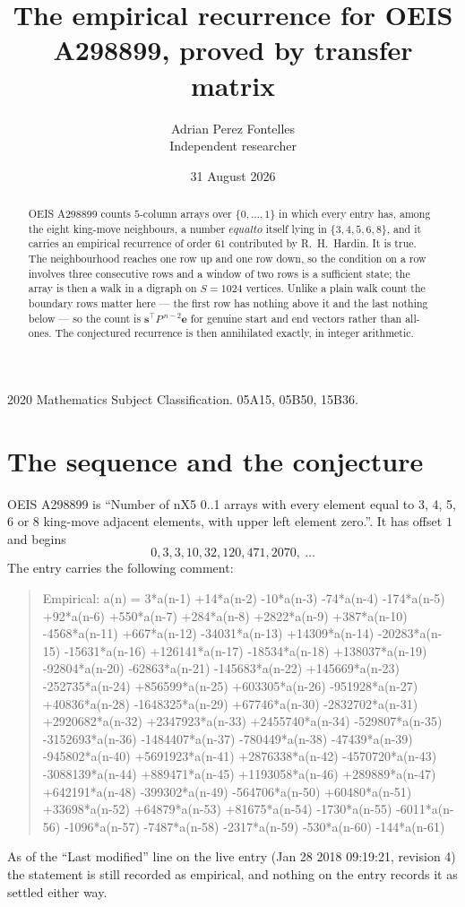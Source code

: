 \documentclass[11pt,a4paper]{article}
\title{The empirical recurrence for OEIS A298899, proved by transfer matrix}
\author{Adrian Perez Fontelles\\ \small Independent researcher}
\date{31 August 2026}
\theoremstyle{plain}
\theoremstyle{definition}
\begin{document}
\maketitle

\begin{abstract}
OEIS A298899 counts $5$-column arrays over $\{0,\dots,1\}$ in which every entry has,
among the eight king-move neighbours, a number $equal to$ itself lying in $\{3,4,5,6,8\}$, and it carries an empirical
recurrence of order $61$ contributed by R.~H.~Hardin. It is true. The neighbourhood
reaches one row up and one row down, so the condition on a row involves three consecutive
rows and a window of two rows is a sufficient state; the array is then a walk in a digraph
on $S=1024$ vertices. Unlike a plain walk count the boundary rows matter here --- the first
row has nothing above it and the last nothing below --- so the count is
$\mathbf{s}^{\!\top}P^{\,n-2}\mathbf{e}$ for genuine start and end vectors rather than
all-ones. The conjectured recurrence is then annihilated exactly, in integer arithmetic.
\end{abstract}

\noindent\small 2020 Mathematics Subject Classification. 05A15, 05B50, 15B36.\normalsize

\section{The sequence and the conjecture}

OEIS A298899 is ``Number of nX5 0..1 arrays with every element equal to 3, 4, 5, 6 or 8 king-move adjacent elements, with upper left element zero.''. It has offset
$1$ and begins
\[
0, 3, 3, 10, 32, 120, 471, 2070,\ \dots
\]
The entry carries the following comment:
\begin{quote}\small
Empirical: a(n) = 3*a(n-1) +14*a(n-2) -10*a(n-3) -74*a(n-4) -174*a(n-5) +92*a(n-6) +550*a(n-7) +284*a(n-8) +2822*a(n-9) +387*a(n-10) -4568*a(n-11) +667*a(n-12) -34031*a(n-13) +14309*a(n-14) -20283*a(n-15) -15631*a(n-16) +126141*a(n-17) -18534*a(n-18) +138037*a(n-19) -92804*a(n-20) -62863*a(n-21) -145683*a(n-22) +145669*a(n-23) -252735*a(n-24) +856599*a(n-25) +603305*a(n-26) -951928*a(n-27) +40836*a(n-28) -1648325*a(n-29) +67746*a(n-30) -2832702*a(n-31) +2920682*a(n-32) +2347923*a(n-33) +2455740*a(n-34) -529807*a(n-35) -3152693*a(n-36) -1484407*a(n-37) -780449*a(n-38) -47439*a(n-39) -945802*a(n-40) +5691923*a(n-41) +2876338*a(n-42) -4570720*a(n-43) -3088139*a(n-44) +889471*a(n-45) +1193058*a(n-46) +289889*a(n-47) +642191*a(n-48) -399302*a(n-49) -564706*a(n-50) +60480*a(n-51) +33698*a(n-52) +64879*a(n-53) +81675*a(n-54) -1730*a(n-55) -6011*a(n-56) -1096*a(n-57) -7487*a(n-58) -2317*a(n-59) -530*a(n-60) -144*a(n-61)
\end{quote}
As of the ``Last modified'' line on the live entry (Jan 28 2018 09:19:21, revision
4) the statement is still recorded as empirical, and nothing on the entry
records it as settled either way.
\end{document}
